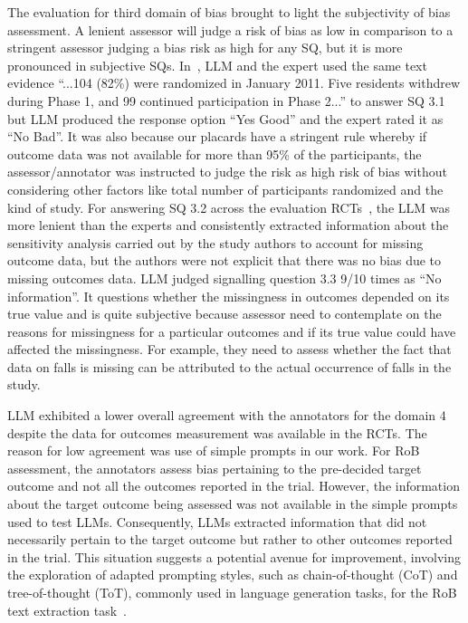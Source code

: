 \documentclass[sn-mathphys,Numbered]{sn-jnl}%
\theoremstyle{thmstyleone}%
\theoremstyle{thmstyletwo}%
\theoremstyle{thmstylethree}%
\begin{document}
The evaluation for third domain of bias brought to light the subjectivity of bias assessment. 
A lenient assessor will judge a risk of bias as low in comparison to a stringent assessor judging a bias risk as high for any SQ, but it is more pronounced in subjective SQs.
In~\cite{thorndike2014activity}, LLM and the expert used the same text evidence ``...104 (82\%) were randomized in January 2011. Five residents withdrew during Phase 1, and 99 continued participation in Phase 2...'' to answer SQ 3.1 but LLM produced the response option ``Yes Good'' and the expert rated it as ``No Bad''.
It was also because our placards have a stringent rule whereby if outcome data was not available for more than 95\% of the participants, the assessor/annotator was instructed to judge the risk as high risk of bias without considering other factors like total number of participants randomized and the kind of study.
For answering SQ 3.2 across the evaluation RCTs~\cite{myer2018integration,taylor2016novel}, the LLM was more lenient than the experts and consistently extracted information about the sensitivity analysis carried out by the study authors to account for missing outcome data, but the authors were not explicit that there was no bias due to missing outcomes data.
LLM judged signalling question 3.3 9/10 times as ``No information''.
It questions whether the missingness in outcomes depended on its true value and is quite subjective because assessor need to contemplate on the reasons for missingness for a particular outcomes and if its true value could have affected the missingness.
For example, they need to assess whether the fact that data on falls is missing can be attributed to the actual occurrence of falls in the study.



LLM exhibited a lower overall agreement with the annotators for the domain 4 despite the data for outcomes measurement was available in the RCTs.
The reason for low agreement was use of simple prompts in our work.
For RoB assessment, the annotators assess bias pertaining to the pre-decided target outcome and not all the outcomes reported in the trial.
However, the information about the target outcome being assessed was not available in the simple prompts used to test LLMs.
Consequently, LLMs extracted information that did not necessarily pertain to the target outcome but rather to other outcomes reported in the trial.
This situation suggests a potential avenue for improvement, involving the exploration of adapted prompting styles, such as chain-of-thought (CoT) and tree-of-thought (ToT), commonly used in language generation tasks, for the RoB text extraction task~\cite{wei2022chain}.
\end{document}
